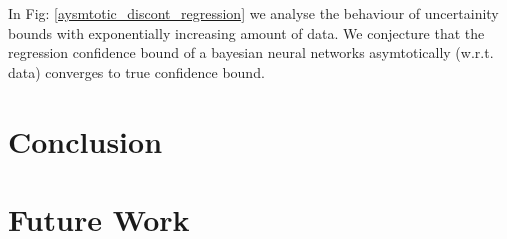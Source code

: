 \documentclass[a4paper, twocolumn]{article}
\begin{document}
In Fig: \ref{aysmtotic_discont_regression} we analyse the behaviour of uncertainity bounds with exponentially increasing amount of data.
We conjecture that the regression confidence bound of a bayesian neural networks asymtotically (w.r.t. data) converges to true confidence bound. 


\section{Conclusion}
\label{sec-6}

\section{Future Work}
\label{sec-7}

\afterpage{\FloatBarrier}
\printbibliography
\end{document}

